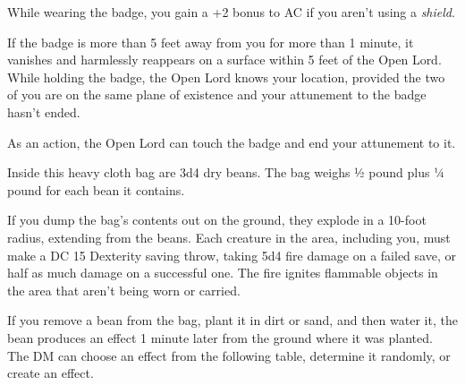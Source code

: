 \documentclass[10pt,a4paper,twoside,bg=print,twocolumn,openany,nodeprecatedcode]{dndbook}
\begin{document}
While wearing the badge, you gain a +2 bonus to AC if you aren't using a \textit{shield}.

If the badge is more than 5 feet away from you for more than 1 minute, it vanishes and harmlessly reappears on a surface within 5 feet of the Open Lord. While holding the badge, the Open Lord knows your location, provided the two of you are on the same plane of existence and your attunement to the badge hasn't ended.

As an action, the Open Lord can touch the badge and end your attunement to it.

Inside this heavy cloth bag are 3d4 dry beans. The bag weighs ½ pound plus ¼ pound for each bean it contains.

If you dump the bag's contents out on the ground, they explode in a 10-foot radius, extending from the beans. Each creature in the area, including you, must make a DC 15 Dexterity saving throw, taking 5d4 fire damage on a failed save, or half as much damage on a successful one. The fire ignites flammable objects in the area that aren't being worn or carried.

If you remove a bean from the bag, plant it in dirt or sand, and then water it, the bean produces an effect 1 minute later from the ground where it was planted. The DM can choose an effect from the following table, determine it randomly, or create an effect.
\end{document}
